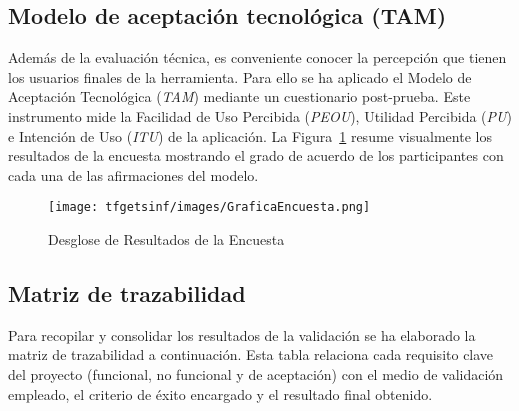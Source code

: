 \subsection{Modelo de aceptación tecnológica (TAM)}

Además de la evaluación técnica, es conveniente conocer la percepción que tienen los usuarios finales de la herramienta. Para ello se ha aplicado el Modelo de Aceptación Tecnológica (\textit{TAM}) mediante un cuestionario post-prueba. Este instrumento mide la Facilidad de Uso Percibida (\textit{PEOU}), Utilidad Percibida (\textit{PU}) e Intención de Uso (\textit{ITU}) de la aplicación. La Figura~\ref{fig:StackedChart} resume visualmente los resultados de la encuesta mostrando el grado de acuerdo de los participantes con cada una de las afirmaciones del modelo.


\begin{figure}[H]
    \centering
    \texttt{[image: tfgetsinf/images/GraficaEncuesta.png]}
    \caption{Desglose de Resultados de la Encuesta}
    \label{fig:StackedChart}
\end{figure}

\subsection{Matriz de trazabilidad}

Para recopilar y consolidar los resultados de la validación se ha elaborado la matriz de trazabilidad a continuación. Esta tabla relaciona cada requisito clave del proyecto (funcional, no funcional y de aceptación) con el medio de validación empleado, el criterio de éxito encargado y el resultado final obtenido.

